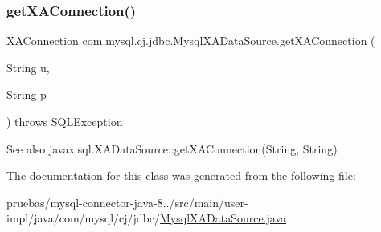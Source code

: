 \subsubsection{\texorpdfstring{get\+X\+A\+Connection()}{getXAConnection()}\hspace{0.1cm}{\footnotesize\ttfamily [2/2]}}
{\footnotesize\ttfamily X\+A\+Connection com.\+mysql.\+cj.\+jdbc.\+Mysql\+X\+A\+Data\+Source.\+get\+X\+A\+Connection (\begin{DoxyParamCaption}\item[{String}]{u,  }\item[{String}]{p }\end{DoxyParamCaption}) throws S\+Q\+L\+Exception}

\begin{DoxySeeAlso}{See also}
javax.\+sql.\+X\+A\+Data\+Source\+::get\+X\+A\+Connection(\+String, String) 
\end{DoxySeeAlso}


The documentation for this class was generated from the following file\+:\begin{DoxyCompactItemize}
\item 
pruebas/mysql-\/connector-\/java-\/8../src/main/user-\/impl/java/com/mysql/cj/jdbc/\mbox{\hyperlink{_mysql_x_a_data_source_8java}{Mysql\+X\+A\+Data\+Source.\+java}}\end{DoxyCompactItemize}
